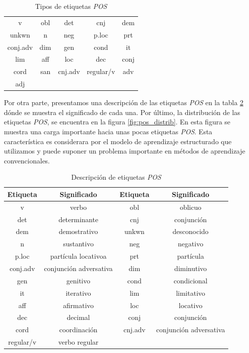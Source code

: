 \documentclass[letterpaper,12pt,oneside]{book}
\theoremstyle{definition}
\begin{document}
\begin{table}
	\centering
	\begin{tabular}{| c | c | c | c | c |}
		\hline
		v & obl & det & cnj & dem \\ 
		unkwn & n & neg & p.loc & prt \\
		conj.adv & dim & gen & cond & it \\
	    lim & aff & loc & dec & conj  \\
	    cord & san & cnj.adv & regular/v & adv \\
	    adj & & & & \\
	    \hline
	\end{tabular}
	\caption{Tipos de etiquetas \textit{POS}} 
	\label{table:pos_types}
\end{table}

Por otra parte, presentamos una descripción de las etiquetas \textit{POS} en la tabla \ref{table:pos_descr} dónde se muestra el significado de cada una. Por último, la distribución de las etiquetas \textit{POS}, se encuentra en la figura \ref{fig:pos_distrib}. En esta figura se muestra una carga importante hacia unas pocas etiquetas \textit{POS}. Esta característica es considerara por el modelo de aprendizaje estructurado que utilizamos y puede suponer un problema importante en métodos de aprendizaje convencionales.

\begin{table}
    \centering
    \begin{tabular}{| c  c | c  c |} \hline
		\textbf{Etiqueta} & \textbf{Significado} & \textbf{Etiqueta} & \textbf{Significado} \\ \hline
		v & verbo & obl & oblicuo \\
		det & determinante & cnj & conjunción \\
		dem & demostrativo & unkwn & desconocido\\ 
		n & sustantivo & neg & negativo \\
		p.loc & partícula locativoa & prt & partícula \\
		conj.adv & conjunción adversativa & dim & diminutivo \\
		gen & genitivo & cond & condicional\\
		it & iterativo & lim & limitativo \\ 
		aff & afirmativo & loc & locativo \\
		dec & decimal & conj & conjunción \\
	    cord & coordinación & cnj.adv & conjunción adversativa \\
	    regular/v & verbo regular & & \\
	    \hline
	\end{tabular}
	\caption{Descripción de etiquetas \textit{POS}}
	\label{table:pos_descr}
\end{table}
\end{document}
